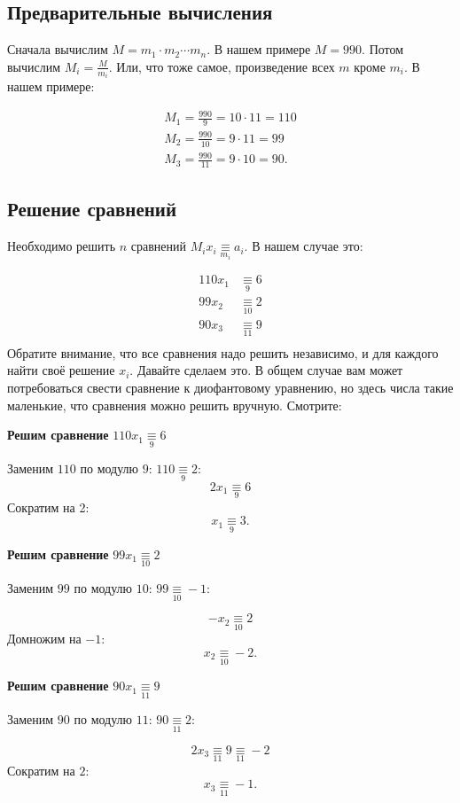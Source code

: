 \documentclass{article}
\newcommand{\eqmod}[1]{\mathbin{\underset{#1}\equiv}}
\begin{document}
\subsection{Предварительные вычисления}

Сначала вычислим $M = m_1\cdot m_2\cdots m_n$. В нашем примере $M = 990$.
Потом вычислим $M_i = \frac{M}{m_i}$. Или, что тоже самое, произведение всех
$m$ кроме $m_i$. В нашем примере:

\begin{gather*}
M_1 = \frac{990}{9} = 10\cdot11 = 110 \\
M_2 = \frac{990}{10} = 9\cdot11 = 99 \\
M_3 = \frac{990}{11} = 9\cdot10 = 90.
\end{gather*}

\subsection{Решение сравнений}

Необходимо решить $n$ сравнений $M_i x_i \eqmod{m_i} a_i$. В нашем случае это:

\[
\begin{aligned}
110x_1 & \eqmod{9} 6 \\
99x_2 & \eqmod{10} 2 \\
90x_3 & \eqmod{11} 9 \\
\end{aligned}
\]
Обратите внимание, что все сравнения надо решить независимо, и для каждого найти своё решение
$x_i$. Давайте сделаем это. В общем случае вам может потребоваться свести сравнение к диофантовому
уравнению, но здесь числа такие маленькие, что сравнения можно решить вручную. Смотрите:

{
\boldmath
\noindent\textbf{Решим сравнение} $ 110x_1 \eqmod{9} 6$
}

Заменим $110$ по модулю $9$: $110\eqmod9 2$:
\[
2x_1 \eqmod{9} 6
\]
Сократим на 2:
\[
x_1 \eqmod{9} 3.
\]

{
\boldmath
\noindent\textbf{Решим сравнение} $99x_1 \eqmod{10} 2$
}

Заменим $99$ по модулю $10$: $99\eqmod{10} -1$:

\[
-x_2 \eqmod{10} 2
\]
Домножим на $-1$:
\[
x_2 \eqmod{10} -2.
\]

{
\boldmath
\noindent\textbf{Решим сравнение} $90x_1 \eqmod{11} 9$
}

Заменим $90$ по модулю $11$: $90\eqmod{11} 2$:

\[
2x_3 \eqmod{11} 9 \eqmod{11} -2
\]
Сократим на $2$:
\[
x_3 \eqmod{11} -1.
\]
\end{document}
